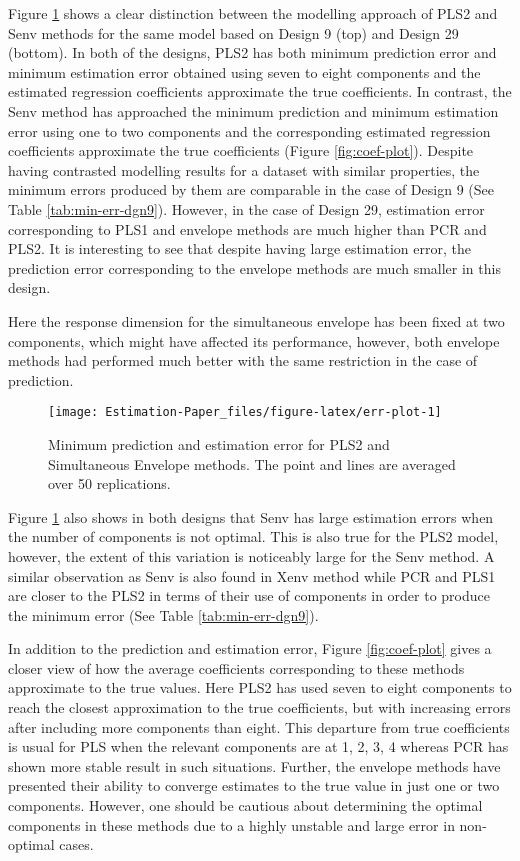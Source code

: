 \documentclass[12pt,3p,authoryear]{elsarticle}
\begin{document}
Figure \ref{fig:err-plot} shows a clear distinction between the modelling approach of PLS2 and Senv methods for the same model based on Design 9 (top) and Design 29 (bottom). In both of the designs, PLS2 has both minimum prediction error and minimum estimation error obtained using seven to eight components and the estimated regression coefficients approximate the true coefficients. In contrast, the Senv method has approached the minimum prediction and minimum estimation error using one to two components and the corresponding estimated regression coefficients approximate the true coefficients (Figure \ref{fig:coef-plot}). Despite having contrasted modelling results for a dataset with similar properties, the minimum errors produced by them are comparable in the case of Design 9 (See Table \ref{tab:min-err-dgn9}). However, in the case of Design 29, estimation error corresponding to PLS1 and envelope methods are much higher than PCR and PLS2. It is interesting to see that despite having large estimation error, the prediction error corresponding to the envelope methods are much smaller in this design.

Here the response dimension for the simultaneous envelope has been fixed at two components, which might have affected its performance, however, both envelope methods had performed much better with the same restriction in the case of prediction.

\begin{figure}
\texttt{[image: Estimation-Paper\_files/figure-latex/err-plot-1]} \caption{Minimum prediction and estimation error for PLS2 and Simultaneous Envelope methods. The point and lines are averaged over 50 replications.}\label{fig:err-plot}
\end{figure}

Figure \ref{fig:err-plot} also shows in both designs that Senv has large estimation errors when the number of components is not optimal. This is also true for the PLS2 model, however, the extent of this variation is noticeably large for the Senv method. A similar observation as Senv is also found in Xenv method while PCR and PLS1 are closer to the PLS2 in terms of their use of components in order to produce the minimum error (See Table \ref{tab:min-err-dgn9}).

In addition to the prediction and estimation error, Figure \ref{fig:coef-plot} gives a closer view of how the average coefficients corresponding to these methods approximate to the true values. Here PLS2 has used seven to eight components to reach the closest approximation to the true coefficients, but with increasing errors after including more components than eight. This departure from true coefficients is usual for PLS when the relevant components are at 1, 2, 3, 4 whereas PCR has shown more stable result in such situations. Further, the envelope methods have presented their ability to converge estimates to the true value in just one or two components. However, one should be cautious about determining the optimal components in these methods due to a highly unstable and large error in non-optimal cases.
\end{document}
